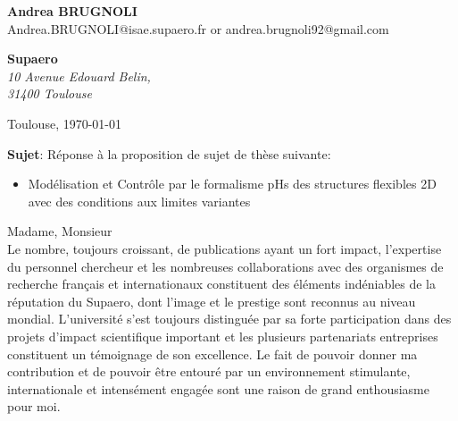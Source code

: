 \documentclass[11pt]{letter}
\begin{document}
 \sffamily
 \begin{flushleft}
 {\bfseries Andrea \textsc{BRUGNOLI}}\\[.35ex]
 Andrea.BRUGNOLI@isae.supaero.fr or andrea.brugnoli92@gmail.com
 \end{flushleft}
 \begin{flushright}
 {\bfseries Supaero}\\[.35ex]
 \small\itshape
 10 Avenue Edouard Belin, \\
 31400 Toulouse
 \end{flushright}
 \begin{flushright}
 Toulouse, \today 
 \end{flushright}
 \textbf{Sujet}: Réponse à la proposition de sujet de thèse suivante:
 \begin{itemize}
\setlength\itemsep{0.4pt}
\item Modélisation et Contrôle par le formalisme pHs des structures flexibles 2D avec des
conditions aux limites variantes
\end{itemize}


Madame, Monsieur \\
Le nombre, toujours croissant, de publications ayant un fort impact, l'expertise du personnel chercheur et les nombreuses collaborations avec des organismes de recherche français et internationaux constituent  des éléments indéniables de la réputation du Supaero, dont l'image et le prestige sont reconnus au niveau mondial. L'université s'est toujours distinguée par sa forte participation dans des projets d'impact scientifique important et les plusieurs partenariats entreprises constituent un témoignage de son excellence. Le fait de pouvoir donner ma contribution et de pouvoir être entouré par un environnement stimulante, internationale et intensément engagée sont une raison de grand enthousiasme pour moi. 
\end{document}
